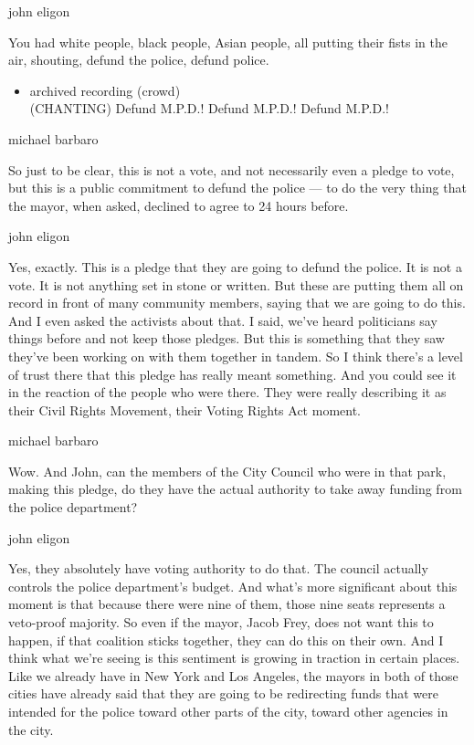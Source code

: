 john eligon

You had white people, black people, Asian people, all putting their
fists in the air, shouting, defund the police, defund police.

\begin{itemize}
\tightlist
\item
  archived recording (crowd)\\
  (CHANTING) Defund M.P.D.! Defund M.P.D.! Defund M.P.D.!
\end{itemize}

michael barbaro

So just to be clear, this is not a vote, and not necessarily even a
pledge to vote, but this is a public commitment to defund the police ---
to do the very thing that the mayor, when asked, declined to agree to 24
hours before.

john eligon

Yes, exactly. This is a pledge that they are going to defund the police.
It is not a vote. It is not anything set in stone or written. But these
are putting them all on record in front of many community members,
saying that we are going to do this. And I even asked the activists
about that. I said, we've heard politicians say things before and not
keep those pledges. But this is something that they saw they've been
working on with them together in tandem. So I think there's a level of
trust there that this pledge has really meant something. And you could
see it in the reaction of the people who were there. They were really
describing it as their Civil Rights Movement, their Voting Rights Act
moment.

michael barbaro

Wow. And John, can the members of the City Council who were in that
park, making this pledge, do they have the actual authority to take away
funding from the police department?

john eligon

Yes, they absolutely have voting authority to do that. The council
actually controls the police department's budget. And what's more
significant about this moment is that because there were nine of them,
those nine seats represents a veto-proof majority. So even if the mayor,
Jacob Frey, does not want this to happen, if that coalition sticks
together, they can do this on their own. And I think what we're seeing
is this sentiment is growing in traction in certain places. Like we
already have in New York and Los Angeles, the mayors in both of those
cities have already said that they are going to be redirecting funds
that were intended for the police toward other parts of the city, toward
other agencies in the city.

